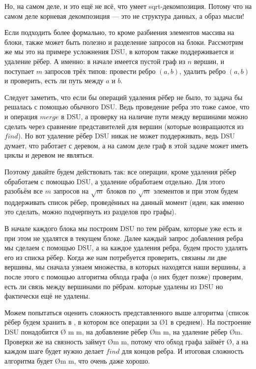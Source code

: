 
Но, на самом деле, и это ещё не всё, что умеет sqrt-декомпозиция. Потому что на самом деле корневая декомпозиция — это не структура данных, а образ мысли!

Если подходить более формально, то кроме разбиения элементов массива на блоки, также может быть полезно и разделение запросов на блоки. Рассмотрим же мы это на примере усложнения DSU, в котором также поддерживается и удаление рёбер. А именно: в начале имеется пустой граф из $n$ вершин, и поступает $m$ запросов трёх типов: провести ребро $(a, b)$, удалить ребро $(a, b)$ и проверить, есть ли путь между $a$ и $b$.

Следует заметить, что если бы операций удаления рёбер не было, то задача бы решалась с помощью обычного DSU. Ведь проведение ребра это тоже самое, что и операция $merge$ в DSU, а проверку на наличие пути между вершинами можно сделать через сравнение представителей для вершин (которые возвращаются из $find$). Но вот удаление рёбер DSU никак не может поддерживать, ведь DSU думает, что работает с деревом, а на самом деле граф в этой задаче может иметь циклы и деревом не являться.

Поэтому давайте будем действовать так: все операции, кроме удаления рёбер обработаем с помощью DSU, а удаление обработаем отдельно. Для этого разобьём все $m$ запросов на $\sqrt{m}$ блоков по $\sqrt{m}$ элементов и при этом будем поддерживать список рёбер, проведённых на данный момент (идеи, как именно это сделать, можно подчерпнуть из разделов про графы).

В начале каждого блока мы построим DSU по тем рёбрам, которые уже есть и при этом не удалятся в текущем блоке. Далее каждый запрос добавления ребра мы сделаем с помощью DSU, а на каждое удаления ребра, будем просто удалять его из списка рёбер. Когда же нам потребуется проверить, связаны ли две вершины, мы сначала узнаем множества, в которых находятся наши вершины, а после этого с помощью алгоритма обхода графа (о них будет позже) проверим, есть ли связь между вершинами по рёбрам. которые удалены из DSU но фактически ещё не удалены.

Можем попытаться оценить сложность представленного выше алгоритма (список рёбер будем хранить в , в котором все операции за \O{1} в среднем). На построение DSU понадобится \O{ \cdot m \ac{m}}, на добавление рёбер \O{m \ac{m}}, на удаление рёбер \O{m}. Проверки же на связность займут \O{m  \ac{m}}, потому что обход графа займёт \O{}, а на каждом шаге будет нужно делает $find$ для концов ребра. И итоговая сложность алгоритма будет \O{m  \ac{m}}, что очень даже хорошо.
